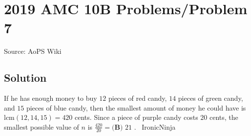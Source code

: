 \documentclass[12pt]{article}
\begin{document}
\section*{{2019 AMC 10B Problems/Problem 7}}
Source: AoPS Wiki

\subsection*{Solution}
If he has enough money to buy $12$ pieces of red candy, $14$ pieces of green candy, and $15$ pieces of blue candy, then the smallest amount of money he could have is $\text{lcm}{(12,14,15)} = 420$ cents. Since a piece of purple candy costs $20$ cents, the smallest possible value of $n$ is $\frac{420}{20} = \boxed{\textbf{(B) } 21}$ . ~IronicNinja
\end{document}
